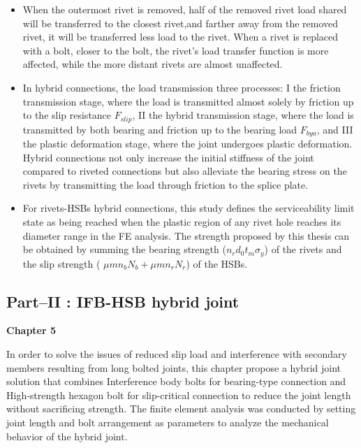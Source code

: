 \begin{itemize}
    
    \item When the outermost rivet is removed, half of the removed rivet load shared will be transferred to the closest rivet,and farther away from the removed rivet, it will be transferred less load to the rivet. When a rivet is replaced with a bolt, closer to the bolt, the rivet's load transfer function is more affected, while the more distant rivets are almost unaffected.

    \item  In hybrid connections, the load transmission three processes: \RN{1} the friction transmission stage, where the load is transmitted almost solely by friction up to the slip resistance $F_{slip}$, \RN{2} the hybrid transmission stage, where the load is transmitted by both bearing and friction up to the bearing load $F_{bya}$, and \RN{3} the plastic deformation stage, where the joint undergoes plastic deformation. Hybrid connections not only increase the initial stiffness of the joint compared to riveted connections but also alleviate the bearing stress on the rivets by transmitting the load through friction to the splice plate.

    \item For rivets-HSBs hybrid connections, this study defines the serviceability limit state as being reached when the plastic region of any rivet hole reaches its diameter range in the FE analysis. The strength proposed by this thesis can be obtained by summing the bearing strength ($n_r d_0 t_m \sigma_{y}$) of the rivets and the slip strength ( $\mu m n_b N_b + \mu m n_r N_r$) of the HSBs.

\end{itemize}


\subsection*{Part--\RN{2} : IFB-HSB hybrid joint}

\textbf{Chapter 5}

In order to solve the issues of reduced slip load and interference with secondary members resulting from long bolted joints, this chapter propose a hybrid joint solution that combines Interference body bolts for bearing-type connection and High-strength hexagon bolt for slip-critical connection to reduce the joint length without sacrificing strength. The finite element analysis was conducted by setting joint length and bolt arrangement as parameters to analyze the mechanical behavior of the hybrid joint.


